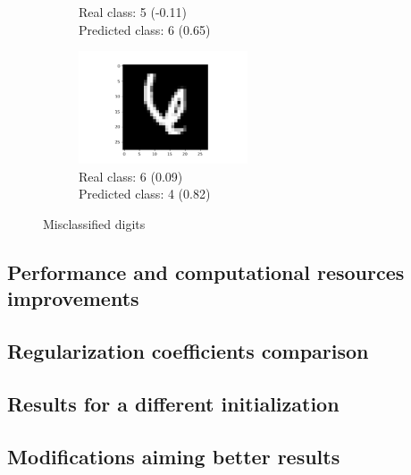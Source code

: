 \documentclass[a4paper]{article}    %
\begin{document}
\begin{figure}[H]
\begin{subfigure}{0.32\textwidth}
        \caption{
            Real class: 5 (-0.11)\\
            Predicted class: 6 (0.65)}
        \label{fig:example_11}
    \end{subfigure}
    \hfill
    \begin{subfigure}{0.32\textwidth}
        \centering
        \includegraphics[width=5.0cm]{29}
        \caption{
            Real class: 6 (0.09)\\
            Predicted class: 4 (0.82)}
        \label{fig:example_12}
    \end{subfigure}
    \hfill
    \caption{Misclassified digits} 
    \label{fig:misclassified_digits}
\end{figure}

\newpage

\subsection{Performance and computational resources improvements}

\subsection{Regularization coefficients comparison}

\subsection{Results for a different initialization}

\subsection{Modifications aiming better results}

\end{document}
